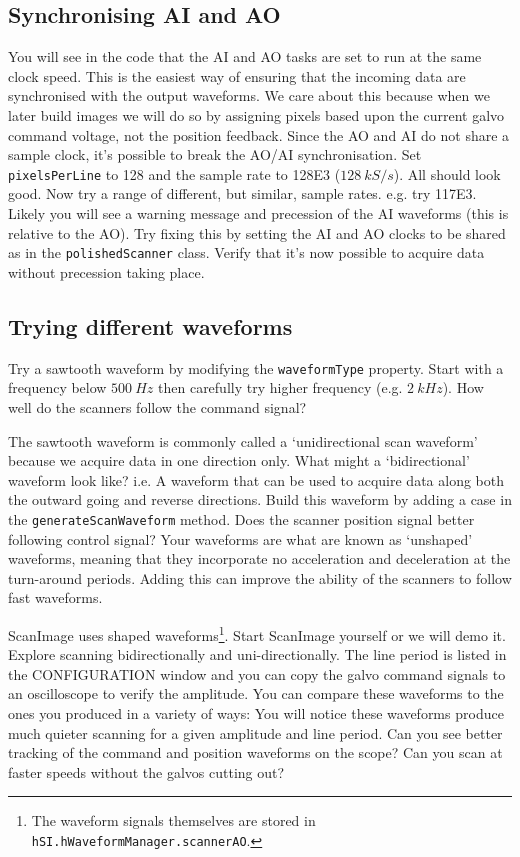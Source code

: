 \documentclass[a4paper]{report}
\begin{document}
\subsection{Synchronising AI and AO}
You will see in the code that the AI and AO tasks are set to run at the same clock speed. 
This is the easiest way of ensuring that the incoming data are synchronised with the output waveforms. 
We care about this because when we later build images we will do so by assigning pixels based upon the current galvo command voltage, not the position feedback.
Since the AO and AI do not share a sample clock, it's possible to break the AO/AI synchronisation. 
Set \texttt{pixelsPerLine} to 128 and the sample rate to 128E3 ($128~kS/s$). 
All should look good. 
Now try a range of different, but similar, sample rates. e.g. try 117E3. 
Likely you will see a warning message and precession of the AI waveforms (this is relative to the AO). 
Try fixing this by setting the AI and AO clocks to be shared as in the \texttt{polishedScanner} class. 
Verify that it's now possible to acquire data without precession taking place.


\subsection{Trying different waveforms}
Try a sawtooth waveform by modifying the \texttt{waveformType} property. 
Start with a frequency below $500~Hz$ then carefully try higher frequency (e.g. $2~kHz$). 
How well do the scanners follow the command signal?

The sawtooth waveform is commonly called a `unidirectional scan waveform' because we acquire data in one direction only. 
What might a `bidirectional' waveform look like? i.e. A waveform that can be used to acquire data along both the outward going and reverse directions. 
Build this waveform by adding a case in the \texttt{generateScanWaveform} method. 
Does the scanner position signal better following control signal?
Your waveforms are what are known as `unshaped' waveforms, meaning that they incorporate no acceleration and deceleration at the turn-around periods. 
Adding this can improve the ability of the scanners to follow fast waveforms.

ScanImage uses shaped waveforms\footnote{The waveform signals themselves are stored in \texttt{hSI.hWaveformManager.scannerAO}.}.
Start ScanImage yourself or we will demo it. 
Explore scanning bidirectionally and uni-directionally. 
The line period is listed in the CONFIGURATION window and you can copy the galvo command signals to an oscilloscope to verify the amplitude. 
You can compare these waveforms to the ones you produced in a variety of ways: 
You will notice these waveforms produce much quieter scanning for a given amplitude and line period.
Can you see better tracking of the command and position waveforms on the scope?
Can you scan at faster speeds without the galvos cutting out? 
\end{document}
